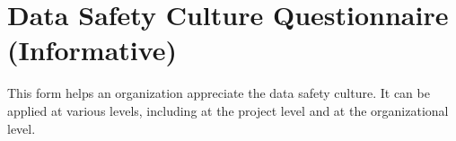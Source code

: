 %
%
\section{Data Safety Culture Questionnaire (Informative)} \label{bkm:culture}


This form helps an organization appreciate the data safety culture. It can be applied at various levels, including at the project level and at the organizational level.

